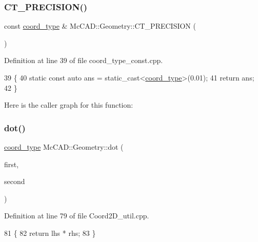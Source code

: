 \subsubsection{\texorpdfstring{C\+T\+\_\+\+P\+R\+E\+C\+I\+S\+I\+O\+N()}{CT\_PRECISION()}}
{\footnotesize\ttfamily const \hyperlink{namespaceMcCAD_1_1Geometry_ac043b37a4a7e849fca22869e1982d2f8}{coord\+\_\+type} \& Mc\+C\+A\+D\+::\+Geometry\+::\+C\+T\+\_\+\+P\+R\+E\+C\+I\+S\+I\+ON (\begin{DoxyParamCaption}{ }\end{DoxyParamCaption})}



Definition at line 39 of file coord\+\_\+type\+\_\+const.\+cpp.


\begin{DoxyCode}
39                            \{
40     \textcolor{keyword}{static} \textcolor{keyword}{const} \textcolor{keyword}{auto} ans = \textcolor{keyword}{static\_cast<}\hyperlink{namespaceMcCAD_1_1Geometry_ac043b37a4a7e849fca22869e1982d2f8}{coord\_type}\textcolor{keyword}{>}(0.01);
41     \textcolor{keywordflow}{return} ans;
42 \}
\end{DoxyCode}
Here is the caller graph for this function\+:
\mbox{\label{namespaceMcCAD_1_1Geometry_ace1ce38b1f97054badfbf16d3432a2c2}} 
\subsubsection{\texorpdfstring{dot()}{dot()}\hspace{0.1cm}{\footnotesize\ttfamily [1/3]}}
{\footnotesize\ttfamily \hyperlink{namespaceMcCAD_1_1Geometry_ac043b37a4a7e849fca22869e1982d2f8}{coord\+\_\+type} Mc\+C\+A\+D\+::\+Geometry\+::dot (\begin{DoxyParamCaption}\item[{const \hyperlink{classMcCAD_1_1Geometry_1_1Coord2D}{Coord2D} \&}]{first,  }\item[{const \hyperlink{classMcCAD_1_1Geometry_1_1Coord2D}{Coord2D} \&}]{second }\end{DoxyParamCaption})}



Definition at line 79 of file Coord2\+D\+\_\+util.\+cpp.


\begin{DoxyCode}
81                            \{
82     \textcolor{keywordflow}{return} lhs * rhs;
83 \}
\end{DoxyCode}
\mbox{\label{namespaceMcCAD_1_1Geometry_a3115a59f432b3fc11f4bac6ee17d979b}} 
